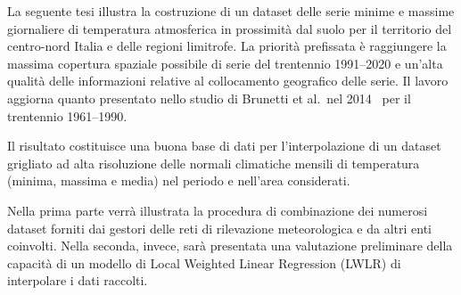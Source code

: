 La seguente tesi illustra la costruzione di un dataset delle serie minime e massime giornaliere di temperatura atmosferica in prossimità dal suolo per il territorio del centro-nord Italia e delle regioni limitrofe. La priorità prefissata è raggiungere la massima copertura spaziale possibile di serie del trentennio 1991--2020 e un'alta qualità delle informazioni relative al collocamento geografico delle serie. Il lavoro aggiorna quanto presentato nello studio di Brunetti et al.\ nel 2014~\cite{brunettiHighresolutionTemperatureClimatology2014} per il trentennio 1961--1990.

Il risultato costituisce una buona base di dati per l'interpolazione di un dataset grigliato ad alta risoluzione delle normali climatiche mensili di temperatura (minima, massima e media) nel periodo e nell'area considerati.

Nella prima parte verrà illustrata la procedura di combinazione dei numerosi dataset forniti dai gestori delle reti di rilevazione meteorologica e da altri enti coinvolti. Nella seconda, invece, sarà presentata una valutazione preliminare della capacità di un modello di Local Weighted Linear Regression (LWLR) di interpolare i dati raccolti.